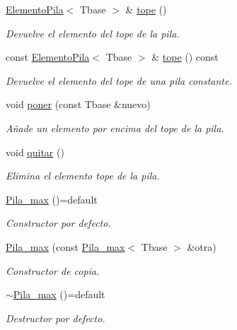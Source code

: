 \begin{DoxyCompactItemize}
\hyperlink{structElementoPila}{Elemento\+Pila}$<$ Tbase $>$ \& \hyperlink{classPila__max_a7d89c4740df471a1d6d0a41f9308406f}{tope} ()
\begin{DoxyCompactList}\small\item\em Devuelve el elemento del tope de la pila. \end{DoxyCompactList}\item 
const \hyperlink{structElementoPila}{Elemento\+Pila}$<$ Tbase $>$ \& \hyperlink{classPila__max_a675ce3ae969e6a9050b0b8289b9d4934}{tope} () const
\begin{DoxyCompactList}\small\item\em Devuelve el elemento del tope de una pila constante. \end{DoxyCompactList}\item 
void \hyperlink{classPila__max_a08e06bab9c6269a0906b6ff47a533088}{poner} (const Tbase \&nuevo)
\begin{DoxyCompactList}\small\item\em Añade un elemento por encima del tope de la pila. \end{DoxyCompactList}\item 
void \hyperlink{classPila__max_a362d8228e46eff38e2d5827a4726b9e9}{quitar} ()
\begin{DoxyCompactList}\small\item\em Elimina el elemento tope de la pila. \end{DoxyCompactList}\item 
\hyperlink{classPila__max_a57b37a9e025685ae0c1ab172192dedb2}{Pila\+\_\+max} ()=default
\begin{DoxyCompactList}\small\item\em Constructor por defecto. \end{DoxyCompactList}\item 
\hyperlink{classPila__max_ab5710c39c42d4d089736bba758c54f69}{Pila\+\_\+max} (const \hyperlink{classPila__max}{Pila\+\_\+max}$<$ Tbase $>$ \&otra)
\begin{DoxyCompactList}\small\item\em Constructor de copia. \end{DoxyCompactList}\item 
\hyperlink{classPila__max_a84d64a0a0cece968a752cc5fb554b362}{$\sim$\+Pila\+\_\+max} ()=default
\begin{DoxyCompactList}\small\item\em Destructor por defecto. \end{DoxyCompactList}\item 

\end{DoxyCompactItemize}
